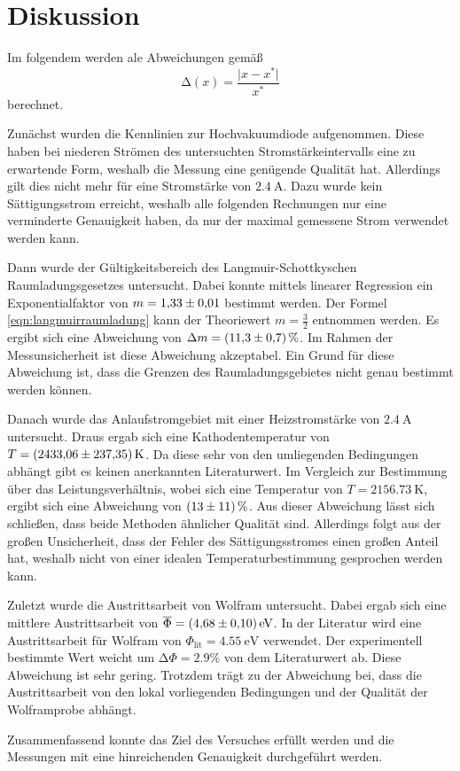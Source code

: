 \section{Diskussion}
\label{sec:Diskussion}
Im folgendem werden ale Abweichungen gemäß 
\begin{equation*}
    \mathrm{\Delta}(x) = \frac{\lvert x - x^*\rvert}{x^*}
\end{equation*}
berechnet.

Zunächst wurden die Kennlinien zur Hochvakuumdiode aufgenommen. Diese haben bei niederen Strömen des untersuchten Stromstärkeintervalls eine zu erwartende Form, weshalb die 
Messung eine genügende Qualität hat. Allerdings gilt dies nicht mehr für eine Stromstärke von $\qty{2.4}{\ampere}$. Dazu wurde kein Sättigungsstrom erreicht, weshalb alle 
folgenden Rechnungen nur eine verminderte Genauigkeit haben, da nur der maximal gemessene Strom verwendet werden kann. 

Dann wurde der Gültigkeitsbereich des Langmuir-Schottkyschen Raumladungsgesetzes untersucht. Dabei konnte mittels linearer Regression ein Exponentialfaktor von 
$m = \num{1.33 +- 0.01}$ bestimmt werden. Der Formel \eqref{eqn:langmuirraumladung} kann der Theoriewert $m = \frac{3}{2}$ entnommen werden. Es ergibt sich eine Abweichung von 
$\mathrm\Delta m = \qty{11.3 +- 0.7}{\percent}$. Im Rahmen der Messunsicherheit ist diese Abweichung akzeptabel. Ein Grund für diese Abweichung ist, dass die Grenzen des 
Raumladungsgebietes nicht genau bestimmt werden können. 

Danach wurde das Anlaufstromgebiet mit einer Heizstromstärke von $\qty{2.4}{\ampere}$ untersucht. Draus ergab sich eine Kathodentemperatur von $T = \qty{2433.06 +- 237.35}{\kelvin}$.
Da diese sehr von den umliegenden Bedingungen abhängt gibt es keinen anerkannten Literaturwert. Im Vergleich zur Bestimmung über das Leistungsverhältnis, wobei sich eine
Temperatur von $T = \qty{2156.73}{\kelvin}$, ergibt sich eine Abweichung von $\qty{13 +- 11}{\percent}$. Aus dieser Abweichung lässt sich schließen, dass beide Methoden ähnlicher Qualität 
sind. Allerdings folgt aus der großen Unsicherheit, dass der Fehler des Sättigungsstromes einen großen Anteil hat, weshalb nicht von einer idealen Temperaturbestimmung 
gesprochen werden kann. 

Zuletzt wurde die Austrittsarbeit von Wolfram untersucht. Dabei ergab sich eine mittlere Austrittsarbeit von $\overline{\Phi} = \qty{4.68+- 0.10}{\electronvolt}$. 
In der Literatur wird eine Austrittsarbeit für Wolfram von $\Phi_\text{lit} = \qty{4.55}{\electronvolt}$\cite{Ingenieurwissen} verwendet. Der experimentell bestimmte Wert weicht um 
$\mathrm{\Delta}\Phi = \num{2.9}\%$ von dem Literaturwert ab. Diese Abweichung ist sehr gering. Trotzdem trägt zu der Abweichung bei, dass die Austrittsarbeit von den
lokal vorliegenden Bedingungen und der Qualität der Wolframprobe abhängt.

Zusammenfassend konnte das Ziel des Versuches erfüllt werden und die Messungen mit eine hinreichenden Genauigkeit durchgeführt werden. 
